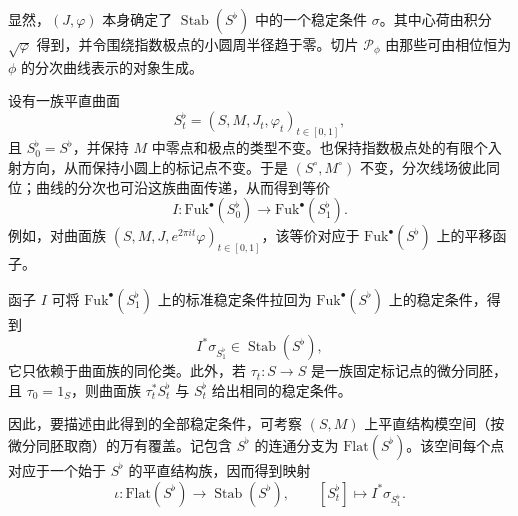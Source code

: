 显然，$(J,\varphi)$ 本身确定了 $\operatorname{Stab}(S^{\flat})$ 中的一个稳定条件 $\sigma$。其中心荷由积分 $\sqrt\varphi$ 得到，并令围绕指数极点的小圆周半径趋于零。切片 $\mathcal P_\phi$ 由那些可由相位恒为 $\phi$ 的分次曲线表示的对象生成。

设有一族平直曲面
\[
  S_t^{\flat}=(S,M,J_t,\varphi_t)_{t\in[0,1]},
\]
且 $S_0^{\flat}=S^{\flat}$，并保持 $M$ 中零点和极点的类型不变。也保持指数极点处的有限个入射方向，从而保持小圆上的标记点不变。于是 $(S^{\circ},M^{\circ})$ 不变，分次线场彼此同位；曲线的分次也可沿这族曲面传递，从而得到等价
\[
  I\colon\mathrm{Fuk}^{\bullet}(S_0^{\flat})
  \longrightarrow\mathrm{Fuk}^{\bullet}(S_1^{\flat}).
\]
例如，对曲面族 $(S,M,J,e^{2\pi it}\varphi)_{t\in[0,1]}$，该等价对应于 $\mathrm{Fuk}^{\bullet}(S^{\flat})$ 上的平移函子。

函子 $I$ 可将 $\mathrm{Fuk}^{\bullet}(S_1^{\flat})$ 上的标准稳定条件拉回为 $\mathrm{Fuk}^{\bullet}(S^{\flat})$ 上的稳定条件，得到
\[
  I^*\sigma_{S_1^{\flat}}\in\operatorname{Stab}(S^{\flat}),
\]
它只依赖于曲面族的同伦类。此外，若 $\tau_t\colon S\to S$ 是一族固定标记点的微分同胚，且 $\tau_0=1_S$，则曲面族 $\tau_t^*S_t^{\flat}$ 与 $S_t^{\flat}$ 给出相同的稳定条件。

因此，要描述由此得到的全部稳定条件，可考察 $(S,M)$ 上平直结构模空间（按微分同胚取商）的万有覆盖。记包含 $S^{\flat}$ 的连通分支为 $\mathrm{Flat}(S^{\flat})$。该空间每个点对应于一个始于 $S^{\flat}$ 的平直结构族，因而得到映射
\[
  \iota\colon\mathrm{Flat}(S^{\flat})\longrightarrow\operatorname{Stab}(S^{\flat}),
  \qquad [S_t^{\flat}]\longmapsto I^*\sigma_{S_1^{\flat}}.
\]

